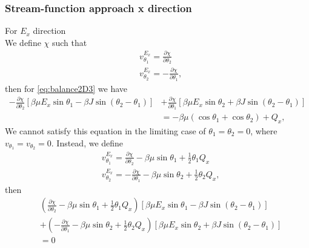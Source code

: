 \documentclass[11pt,reqno]{amsart}
\begin{document}
\subsubsection{Stream-function approach x direction}
For $E_x$ direction \\
We define $\chi$ such that
\begin{subequations}
\label{eq:chiDef}
\begin{align}
&{ v}^{E_x}_{\theta_1}=\frac{\partial \chi}{\partial \theta_2}\\
&{ v}^{E_x}_{\theta_2}=-\frac{\partial \chi}{\partial \theta_1},
\end{align}
\end{subequations}
then for \eqref{eq:balance2D3} we have
\begin{align}
\label{eq:balance2Dchi}
- \frac{\partial \chi}{\partial \theta_2} [\beta\mu E_x \sin\theta_1 - \beta J \sin(\theta_2-\theta_1)]&+ \frac{\partial \chi}{\partial\theta_1} [\beta\mu E_x \sin\theta_2 + \beta J \sin(\theta_2-\theta_1)]\nonumber\\
&= -\beta\mu(\cos\theta_1+\cos\theta_2) + Q_x,
\end{align}
We cannot satisfy this equation in the limiting case of $\theta_1 = \theta_2 = 0$, where $v_{\theta_1} = v_{\theta_2} = 0$. Instead, we define
\begin{subequations}
\label{eq:chiDef2}
\begin{align}
&{ v}^{E_x}_{\theta_1}=\frac{\partial \chi}{\partial \theta_2}-\beta\mu\sin\theta_1 + \frac{1}{2}\theta_1 Q_x\\
&{ v}^{E_x}_{\theta_2}=-\frac{\partial \chi}{\partial \theta_1}-\beta\mu\sin\theta_2 + \frac{1}{2}\theta_2 Q_x,
\end{align}
\end{subequations}
then
\begin{align}
\label{eq:balance2Dchi2}
&\left(\frac{\partial \chi}{\partial \theta_2} -\beta\mu\sin\theta_1 + \frac{1}{2}\theta_1 Q_x\right)[\beta\mu E_x \sin\theta_1 - \beta J \sin(\theta_2-\theta_1)]\nonumber\\
&+ \left(-\frac{\partial \chi}{\partial\theta_1}-\beta\mu\sin\theta_2 + \frac{1}{2}\theta_2 Q_x\right) [\beta\mu E_x \sin\theta_2 + \beta J \sin(\theta_2-\theta_1)]\nonumber\\
&= 0
\end{align}
\end{document}
